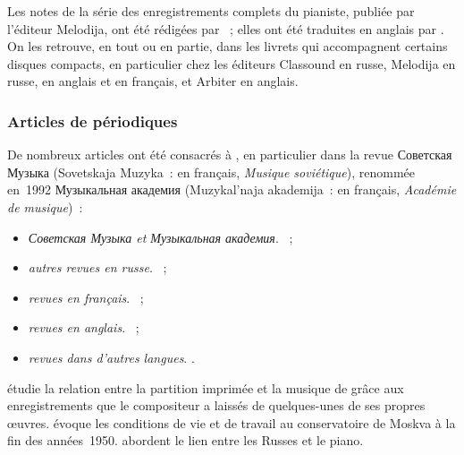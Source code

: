 Les notes de la série des enregistrements complets du pianiste, publiée par
l'éditeur Melodija, ont été rédigées par \citet{Nikonovich79}~; elles ont
été traduites en anglais par \citet[p.~\hbox{2-22}]{White}.
On les retrouve, en tout ou en partie, dans les livrets qui accompagnent
certains disques compacts, en particulier chez les éditeurs Classound en
russe, Melodija en russe, en anglais et en français, et Arbiter en anglais.

\subsubsection{Articles de périodiques}

De nombreux articles ont été consacrés à \VSofronitsky{}, en particulier
dans la revue \foreignlanguage{russian}{Советская Музыка} (Sovetskaja
Muzyka~: en français, \emph{Musique soviétique}), renommée en~1992
\foreignlanguage{russian}{Музыкальная академия} (Muzykal'naja akademija~:
en français, \emph{Académie de musique})~:
\begin{itemize}
 \item\emph{\foreignlanguage{russian}{Советская Музыка} et
 \foreignlanguage{russian}{Музыкальная академия}}.
 \citet{Adzhemov59, Adzhemov60, Adzhemov61, Barenboim47, Bashkirov61,
 Bogdanov65, Delson34, Gakkel72, Milshteyn51, Nikolaiev49, Nikonovich61,
 Nikonovich68a, Nikonovich68b, Nikonovich69, Nikonovich77, Paperno89a,
 Paperno89b, Paperno89c, Paperno89d, Paperno89e, Podolskaya60, Rabinovich57,
 Rabinovich58, Rabinovich60, Rabinovich61, Rabinovich61b, Savshinsky61,
 Sofronitsky46, Sofronitsky61}~;
 \item\emph{autres revues en russe}.
 \citet{Badeyan03, Barenboim45, Genn08, Piskounova}~;
 \item\emph{revues en français}.
 \citet{Cochard08a, Engerer, Lompech85a, Lompech85c, Lompech86, Macassar,
 Thomas84}~;
 \item\emph{revues en anglais}.
 \citet{Bowers59, Brown14, Juban, Leikin96, Lobanov91, Malik23, Paperno84,
 Siepmann, Tassie, Young91, Zaltsberg}~;
 \item\emph{revues dans d'autres langues}.
 \citet{He12, Rattalino95, Schiavon, Sofronitskaya01, Voskobojnikov90,
 Voskobojnikov09a, Voskobojnikov09b}.
\end{itemize}

\citeauthor{Leikin96} étudie la relation entre la partition imprimée et la
musique de \Scriabine{} grâce aux enregistrements que le compositeur a
laissés de quelques-unes de ses propres œuvres.
\citeauthor{Bowers59} évoque les conditions de vie et de travail au
conservatoire de Moskva à la fin des années~1950.
\citeauthor{Engerer} abordent le lien entre les Russes et le piano.

